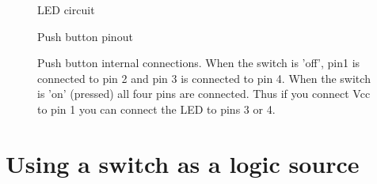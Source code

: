 \documentclass{UoNMCHA}
\numberwithin{equation}{section}
\begin{document}
\begin{figure}[H]
\caption{LED circuit}
\label{fig:ledcct}
\end{figure}
    

\begin{figure}[H]
\caption{Push button pinout}
\label{fig:swcad}
\end{figure}

\begin{figure}[H]
\caption{Push button internal connections. When the switch is 'off', pin1 is connected to pin 2 and pin 3 is connected to pin 4. When the switch is 'on' (pressed) all four pins are connected. Thus if you connect Vcc to pin 1 you can connect the LED to pins 3 or 4. }
\label{fig:swpinout}
\end{figure}

\pagebreak

\section{Using a switch as a logic source}
\end{document}
